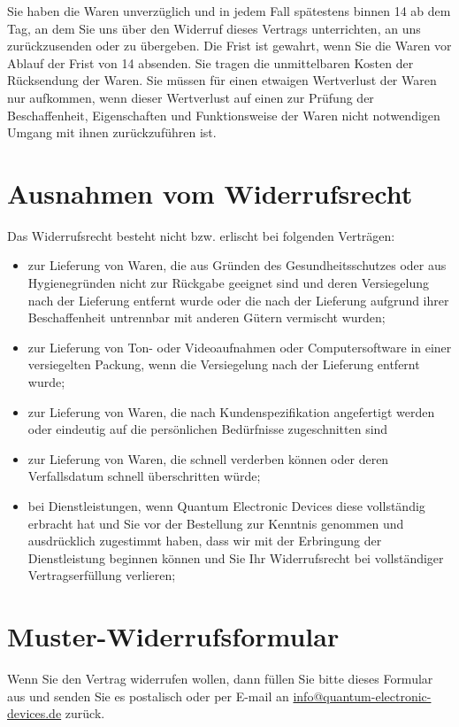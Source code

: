 \documentclass[%
    a4paper,%
    10pt,
]{scrartcl}
\begin{document}
Sie haben die Waren unverzüglich und in jedem Fall spätestens binnen \qty{14}{\days} ab dem Tag, an dem Sie uns über den Widerruf dieses Vertrags unterrichten, an uns zurückzusenden oder zu übergeben. Die Frist ist gewahrt, wenn Sie die Waren vor Ablauf der Frist von \qty{14}{\days} absenden. Sie tragen die unmittelbaren Kosten der Rücksendung der Waren. Sie müssen für einen etwaigen Wertverlust der Waren nur aufkommen, wenn dieser Wertverlust auf einen zur Prüfung der Beschaffenheit, Eigenschaften und Funktionsweise der Waren nicht notwendigen Umgang mit ihnen zurückzuführen ist.

\section*{Ausnahmen vom Widerrufsrecht}
Das Widerrufsrecht besteht nicht bzw. erlischt bei folgenden Verträgen:
\begin{itemize}
  \item zur Lieferung von Waren, die aus Gründen des Gesundheitsschutzes oder aus Hygienegründen nicht zur Rückgabe geeignet sind und deren Versiegelung nach der Lieferung entfernt wurde oder die nach der Lieferung aufgrund ihrer Beschaffenheit untrennbar mit anderen Gütern vermischt wurden;
  \item zur Lieferung von Ton- oder Videoaufnahmen oder Computersoftware in einer versiegelten Packung, wenn die Versiegelung nach der Lieferung entfernt wurde;
  \item zur Lieferung von Waren, die nach Kundenspezifikation angefertigt werden oder eindeutig auf die persönlichen Bedürfnisse zugeschnitten sind
  \item zur Lieferung von Waren, die schnell verderben können oder deren Verfallsdatum schnell überschritten würde;
  \item bei Dienstleistungen, wenn Quantum Electronic Devices diese vollständig erbracht hat und Sie vor der Bestellung zur Kenntnis genommen und ausdrücklich zugestimmt haben, dass wir mit der Erbringung der Dienstleistung beginnen können und Sie Ihr Widerrufsrecht bei vollständiger Vertragserfüllung verlieren;
\end{itemize}

\newpage
\section*{Muster-Widerrufsformular}
Wenn Sie den Vertrag widerrufen wollen, dann füllen Sie bitte dieses Formular aus und senden Sie es postalisch oder per E-mail an \href{mailto:info@quantum-electronic-devices.de}{info@quantum-electronic-devices.de} zurück.
\end{document}
